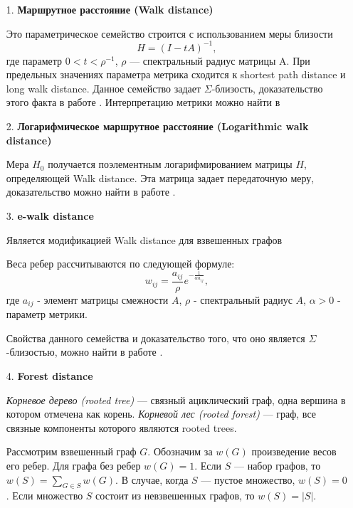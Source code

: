 \begin{itemize}
\item[1.] \textbf{Маршрутное расстояние (Walk distance)}

Это параметрическое семейство строится с использованием меры близости 
\begin{equation}
H = (I - tA)^{-1},
\end{equation}
где параметр $0 < t < \rho ^{-1}$, $\rho$ --- спектральный радиус матрицы A. При предельных значениях параметра метрика сходится к shortest path distance и long walk distance. Данное семейство задает $\Sigma$-близость, доказательство этого факта в работе \cite{chebotarev2012walk}. Интерпретацию метрики можно найти в \cite{chebotarev2012walk}

\item[2.] \textbf{Логарифмическое маршрутное расстояние (Logarithmic walk distance)}

Мера $H_0$ получается поэлементным логарифмированием матрицы $H$, определяющей Walk distance. Эта матрица задает передаточную меру, доказательство можно найти в работе \cite{chebotarev2011bottleneck}.

\item[3.] \textbf{e-walk distance}

Является модификацией Walk distance для взвешенных графов 

Веса ребер рассчитываются по следующей формуле: \begin{equation}
w_{ij} = \frac{a_{ij}}{\rho} e^{-\frac{1}{\alpha a_{ij}}},
\end{equation} где $a_{ij}$ - элемент матрицы смежности $A$, $\rho$ - спектральный радиус $A$, $\alpha > 0$ - параметр метрики.

Свойства данного семейства и доказательство того, что оно является $\Sigma$-близостью, можно найти в работе \cite{chebotarev2012walk}.

\item[4.] \textbf{Forest distance}

\emph{Корневое дерево (rooted tree)} --- связный ациклический граф, одна вершина в котором отмечена как корень. \emph{Корневой лес (rooted forest)} --- граф, все связные компоненты которого являются rooted trees.

Рассмотрим взвешенный граф $G$. Обозначим за $w(G)$ произведение весов его ребер. Для графа без ребер $w(G) = 1$. Если $S$ --- набор графов, то $w(S) = \sum\limits_{G \in S} w(G)$.  В случае, когда $S$ --- пустое множество, $w(S) = 0$. Если множество $S$ состоит из невзвешенных графов, то $w(S) = |S|$.


\end{itemize}
